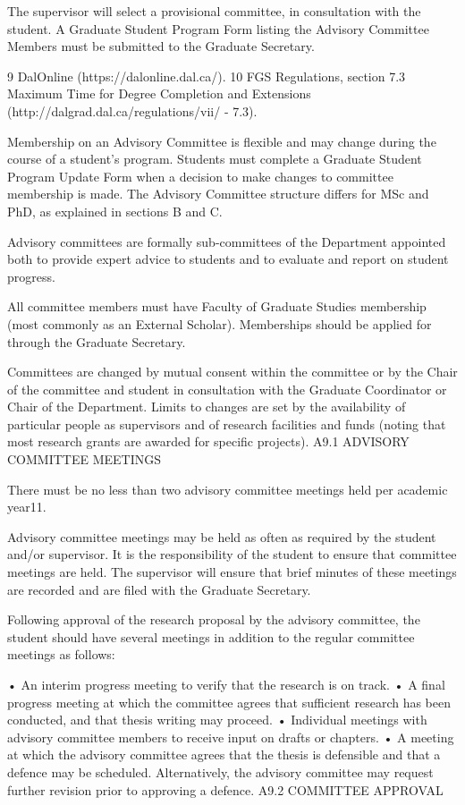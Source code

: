 The supervisor will select a provisional committee, in consultation with the student. A Graduate Student Program Form listing the Advisory Committee Members must be submitted to the Graduate Secretary.


9 DalOnline (https://dalonline.dal.ca/).
10 FGS Regulations, section 7.3 Maximum Time for Degree Completion and Extensions (http://dalgrad.dal.ca/regulations/vii/ - 7.3).
 

Membership on an Advisory Committee is flexible and may change during the course of a student’s program. Students must complete a Graduate Student Program Update Form when a decision to make changes to committee membership is made. The Advisory Committee structure differs for MSc and PhD, as explained in sections B and C.

Advisory committees are formally sub-committees of the Department appointed both to provide expert advice to students and to evaluate and report on student progress.

All committee members must have Faculty of Graduate Studies membership (most commonly as an External Scholar). Memberships should be applied for through the Graduate Secretary.

Committees are changed by mutual consent within the committee or by the Chair of the committee and student in consultation with the Graduate Coordinator or Chair of the Department. Limits to changes are set by the availability of particular people as supervisors and of research facilities and funds (noting that most research grants are awarded for specific projects).
A9.1	ADVISORY COMMITTEE MEETINGS

There must be no less than two advisory committee meetings held per academic year11.

Advisory committee meetings may be held as often as required by the student and/or supervisor. It is the responsibility of the student to ensure that committee meetings are held. The supervisor will ensure that brief minutes of these meetings are recorded and are filed with the Graduate Secretary.

Following approval of the research proposal by the advisory committee, the student should have several meetings in addition to the regular committee meetings as follows:

•	An interim progress meeting to verify that the research is on track.
•	A final progress meeting at which the committee agrees that sufficient research has been conducted, and that thesis writing may proceed.
•	Individual meetings with advisory committee members to receive input on drafts or chapters.
•	A meeting at which the advisory committee agrees that the thesis is defensible and that a defence may be scheduled. Alternatively, the advisory committee may request further revision prior to approving a defence.
A9.2	COMMITTEE APPROVAL

